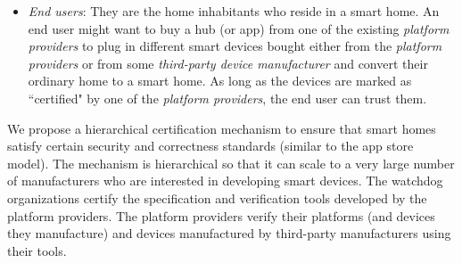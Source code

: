 \documentclass{article}
\begin{document}
\begin{itemize}[topsep=0pt,itemsep=0ex,partopsep=1ex,parsep=1ex]
\item \textit{End users}: They are the home inhabitants who reside in a smart home. An end user might want to buy a hub (or app) from one of the existing \textit{platform providers} to plug in different smart devices bought either from the \textit{platform providers} or from some \textit{third-party device manufacturer} and convert their ordinary home to a smart home. As long as the devices are marked as ``certified" by one of the \textit{platform providers}, the end user can trust them.
\end{itemize}

We propose a hierarchical certification mechanism to ensure that smart homes satisfy certain security and correctness standards (similar to the app store model). The  mechanism is hierarchical so that it can scale to a very large number of manufacturers who are interested in developing smart devices. The watchdog organizations certify the specification and verification tools developed by the platform providers. The platform providers verify their platforms (and devices they manufacture) and devices manufactured by third-party manufacturers using their tools.     


\end{document}
